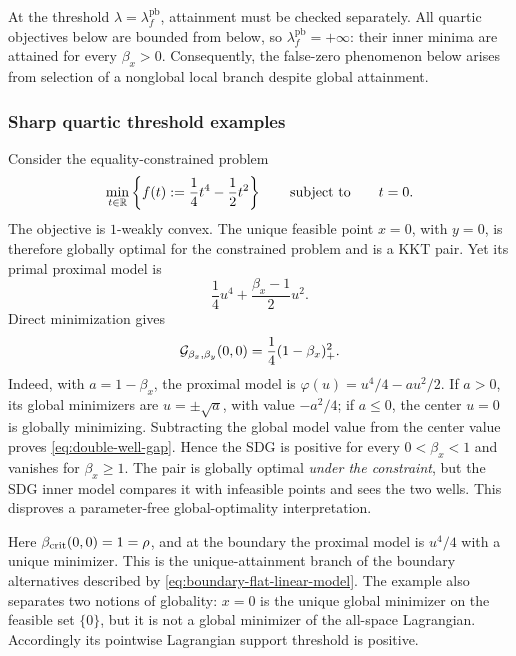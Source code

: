 At the threshold
\(\lambda=\lambda_f^{\mathrm{pb}}\), attainment must be checked separately.
All quartic objectives below are bounded from below, so
\(\lambda_f^{\mathrm{pb}}=+\infty\): their inner minima are attained for
every \(\beta_x>0\).  Consequently, the false-zero phenomenon below arises
from selection of a nonglobal local branch despite global attainment.

\subsubsection{Sharp quartic threshold examples}

\begin{example}
  \label{ex:double-well}
  Consider the equality-constrained problem
  \[
    \min_{t\in\mathbb{R}}\left\{
      f(t):=\frac14t^4-\frac12t^2
    \right\}
    \qquad\text{subject to}\qquad t=0.
  \]
  The objective is \(1\)-weakly convex.  The unique feasible point \(x=0\),
  with \(y=0\), is therefore globally optimal for the constrained problem and
  is a KKT pair.  Yet its primal proximal model is
  \[
    \frac14u^4+\frac{\beta_x-1}{2}u^2.
  \]
  Direct minimization gives
  \begin{equation}
    \mathcal{G}_{\beta_x,\beta_y}(0,0)
    =\frac14(1-\beta_x)_+^2.
    \label{eq:double-well-gap}
  \end{equation}
  Indeed, with \(a=1-\beta_x\), the proximal model is
  \(\varphi(u)=u^4/4-au^2/2\).  If \(a>0\), its global minimizers are
  \(u=\pm\sqrt a\), with value \(-a^2/4\); if \(a\le0\), the center \(u=0\)
  is globally minimizing.  Subtracting the global model value from the
  center value proves \cref{eq:double-well-gap}.
  Hence the SDG is positive for every \(0<\beta_x<1\) and vanishes for
  \(\beta_x\ge1\).  The pair is globally optimal \emph{under the constraint},
  but the SDG inner model compares it with infeasible points and sees the two
  wells.  This disproves a parameter-free global-optimality interpretation.
\end{example}

Here \(\beta_{\mathrm{crit}}(0,0)=1=\rho\), and at the boundary the proximal model is
\(u^4/4\) with a unique minimizer.  This is the unique-attainment branch of
the boundary alternatives described by
\cref{eq:boundary-flat-linear-model}.  The example also separates two notions
of globality: \(x=0\) is the unique global minimizer on the feasible set
\(\{0\}\), but it is not a global minimizer of the all-space Lagrangian.
Accordingly its pointwise Lagrangian support threshold is positive.


